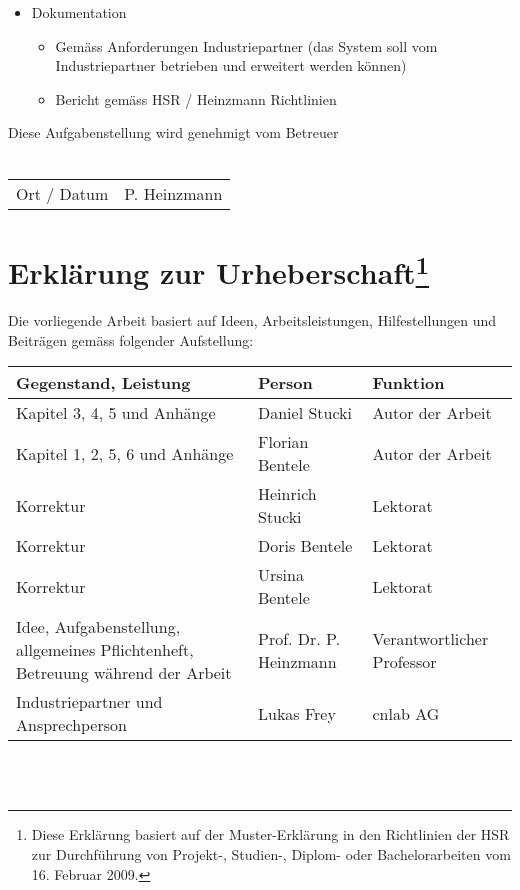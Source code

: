 \begin{itemize}
\item Dokumentation
\begin{itemize}
\item Gemäss Anforderungen Industriepartner (das System soll vom Industriepartner betrieben und erweitert werden können)
\item Bericht gemäss HSR / Heinzmann Richtlinien
\end{itemize}
\end{itemize}

Diese Aufgabenstellung wird genehmigt vom Betreuer
\\
\\

\begin{tabular}{p{3cm}p{4cm}}
\hline
Ort / Datum & P. Heinzmann
\end{tabular}

\section*{Erklärung zur Urheberschaft\footnote{Diese Erklärung basiert auf der Muster-Erklärung in den Richtlinien der HSR zur Durchführung von Projekt-, Studien-, Diplom- oder Bachelorarbeiten vom 16. Februar 2009.}}
Die vorliegende Arbeit basiert auf Ideen, Arbeitsleistungen, Hilfestellungen und Beiträgen gemäss folgender Aufstellung:
\\

\begin{tabular}{|m{5cm}|m{3.7cm}|m{3cm}|}
\hline
Gegenstand, Leistung & Person & Funktion \\[5pt]\hline\hline
Kapitel 3, 4, 5 und Anhänge & Daniel Stucki & Autor der Arbeit\\[5pt]\hline
Kapitel 1, 2, 5, 6 und Anhänge & Florian Bentele & Autor der Arbeit\\[5pt]\hline
Korrektur & Heinrich Stucki & Lektorat \\[5pt]\hline
Korrektur & Doris Bentele & Lektorat \\[5pt]\hline
Korrektur & Ursina Bentele & Lektorat \\[5pt]\hline
Idee, Aufgabenstellung, allgemeines Pflichtenheft, Betreuung während der Arbeit & Prof. Dr. P. Heinzmann & Verantwortlicher Professor \\[5pt]\hline
Industriepartner und Ansprechperson & Lukas Frey & cnlab AG \\[5pt]\hline
\end{tabular}
\\
\\

